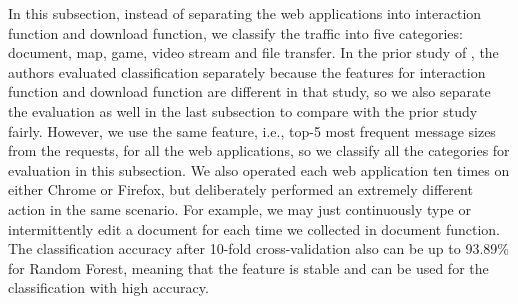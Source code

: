\documentclass[preprint,12pt]{elsarticle}
\begin{document}
In this subsection, instead of separating the web applications into interaction function and download function, we classify the traffic into five categories: document, map, game, video stream and file transfer. In the prior study of \cite{TFT14}, the authors evaluated classification separately because the features for interaction function and download function are different in that study, so we also separate the evaluation as well in the last subsection to compare with the prior study fairly. However, we use the same feature, i.e., top-5 most frequent message sizes from the requests, for all the web applications, so we classify all the categories for evaluation in this subsection. We also operated each web application ten times on either Chrome or Firefox, but deliberately performed an extremely different action in the same scenario. For example, we may just continuously type or intermittently edit a document for each time we collected in document function. The classification accuracy after 10-fold cross-validation also can be up to 93.89\% for Random Forest, meaning that the feature is stable and can be used for the classification with high accuracy. 
\end{document}
